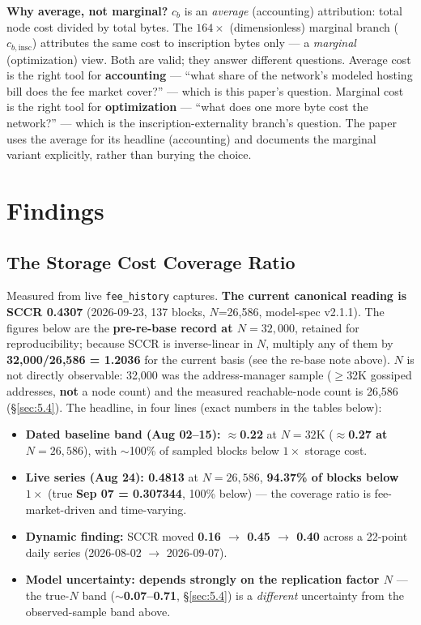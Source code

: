 \documentclass[11pt]{article}
\begin{document}
\textbf{Why average, not marginal?} $c_b$ is an \emph{average} (accounting) attribution: total node cost divided by total bytes. The $164\times$ (dimensionless) marginal branch ($c_{b,\mathrm{insc}}$) attributes the same cost to inscription bytes only --- a \emph{marginal} (optimization) view. Both are valid; they answer different questions. Average cost is the right tool for \textbf{accounting} --- ``what share of the network's modeled hosting bill does the fee market cover?'' --- which is this paper's question. Marginal cost is the right tool for \textbf{optimization} --- ``what does one more byte cost the network?'' --- which is the inscription-externality branch's question. The paper uses the average for its headline (accounting) and documents the marginal variant explicitly, rather than burying the choice.

\section{Findings}\label{sec:5}
\subsection{The Storage Cost Coverage Ratio}\label{sec:5.1}
Measured from live \texttt{fee\_history} captures. \textbf{The current canonical reading is SCCR 0.4307} (2026-09-23, 137 blocks, $N$=26{,}586, model-spec v2.1.1). The figures below are the \textbf{pre-re-base record at $N=32{,}000$}, retained for reproducibility; because SCCR is inverse-linear in $N$, multiply any of them by \textbf{32{,}000/26{,}586 = 1.2036} for the current basis (see the re-base note above). $N$ is not directly observable: 32{,}000 was the address-manager sample ($\geq$32K gossiped addresses, \textbf{not} a node count) and the measured reachable-node count is 26{,}586 (\S\ref{sec:5.4}). The headline, in four lines (exact numbers in the tables below):

\begin{itemize}
\item \textbf{Dated baseline band (Aug 02--15): $\approx$0.22} at $N=32$K (\textbf{$\approx$0.27 at $N=26{,}586$}), with $\sim$100\% of sampled blocks below $1\times$ storage cost.
\item \textbf{Live series (Aug 24): 0.4813} at $N=26{,}586$, \textbf{94.37\% of blocks below $1\times$} (true \textbf{Sep 07 = 0.307344}, 100\% below) --- the coverage ratio is fee-market-driven and time-varying.
\item \textbf{Dynamic finding:} SCCR moved \textbf{0.16 $\rightarrow$ 0.45 $\rightarrow$ 0.40} across a 22-point daily series (2026-08-02 $\rightarrow$ 2026-09-07).
\item \textbf{Model uncertainty: depends strongly on the replication factor $N$} --- the true-$N$ band (\textbf{$\sim$0.07--0.71}, \S\ref{sec:5.4}) is a \emph{different} uncertainty from the observed-sample band above.
\end{itemize}
\end{document}
